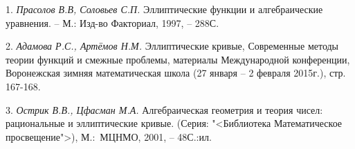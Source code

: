 \litlist

1. {\it Прасолов В.В, Соловьев С.П. } Эллиптические функции и алгебраические уравнения. -- М.: Изд-во Факториал, 1997, -- 288С.

2. {\it Адамова Р.С., Артёмов Н.М. }
Эллиптические кривые, Современные методы теории функций и смежные проблемы, материалы Международной конференции,
Во\-ро\-не\-ж\-с\-кая зимняя математическая школа (27 января -- 2 февраля 2015г.), стр. 167-168.

3. {\it Острик В.В., Цфасман М.А.   } Алгебраическая геометрия и теория чисел: рациональные и эллиптические кривые.
(Серия: "<Библиотека \glqq Математическое просвещение\grqq ">),
\linebreak
М.:~МЦНМО, 2001, -- 48С.:ил.
